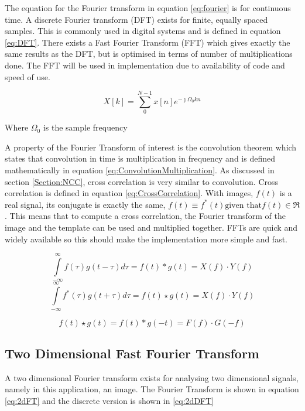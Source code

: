 The equation for the Fourier transform in equation \eqref{eq:fourier} is for continuous time. A discrete Fourier transform (DFT) exists for finite, equally spaced samples. This is commonly used in digital systems and is defined in equation \eqref{eq:DFT}. There exists a Fast Fourier Transform (FFT) which gives exactly the same results as the DFT, but is optimised in terms of number of multiplications done. The FFT will be used in implementation due to availability of code and speed of use. 

\begin{equation}\label{eq:DFT}
X[k] = \sum\limits_{0}^{N-1}x[n]e^{-\jmath \Omega_0 kn}
\end{equation}
\begin{center}
Where $\Omega_0$ is the sample frequency
\end{center}

A property of the Fourier Transform of interest is the convolution theorem which states that convolution in time is multiplication in frequency and is defined mathematically in equation \eqref{eq:ConvolutionMultiplication}. As discussed in section \ref{Section:NCC}, cross correlation is very similar to convolution. Cross correlation is defined in equation \eqref{eq:CrossCorrelation}. With images, $f(t)$ is a real signal, its conjugate is exactly the same, $f(t) \equiv f^*(t) \text{given that} f(t) \in \Re$. This means that to compute a cross correlation, the Fourier transform of the image and the template can be used and multiplied together. FFTs are quick and widely available so this should make the implementation more simple and fast.


\begin{equation}\label{eq:ConvolutionMultiplication}
\int\limits_{-\infty}^{\infty}f(\tau)g(t-\tau)d\tau = f(t) \ast g(t) = X(f)\cdot Y(f)
\end{equation}
\begin{equation}\label{eq:CrossCorrelation}
\int\limits_{-\infty}^{\infty}f^*(\tau)g(t+\tau)d\tau = f(t) \star g(t) = X(f)\cdot Y(f)
\end{equation}

\begin{equation}\label{eq:CCtoConv}
f(t) \star g(t) = f(t) \ast g(-t) = F(f) \cdot G(-f)
\end{equation}

\subsection{Two Dimensional Fast Fourier Transform}
A two dimensional Fourier transform exists for analysing two dimensional signals, namely in this application, an image. The Fourier Transform is shown in equation \eqref{eq:2dFT} and the discrete version is shown in \eqref{eq:2dDFT}

